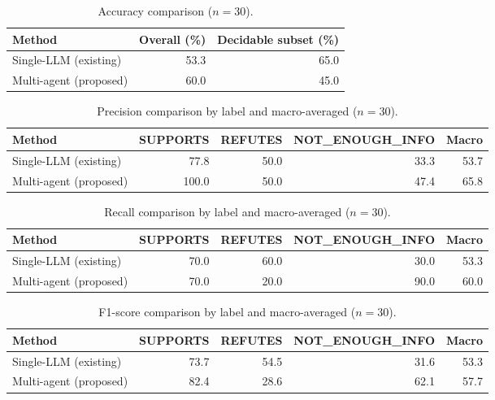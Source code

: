 
\begin{table}[H]
\centering
\caption{Accuracy comparison ($n = 30$).}
\label{tab:acc}
\small
\begin{tabular}{@{}lrr@{}}
\toprule
Method & Overall (\%) & Decidable subset (\%) \\
\midrule
Single-LLM (existing) & 53.3 & 65.0 \\
Multi-agent (proposed) & 60.0 & 45.0 \\
\bottomrule
\end{tabular}
\end{table}

\begin{table}[H]
\centering
\caption{Precision comparison by label and macro-averaged ($n = 30$).}
\label{tab:precision}
\small
\begin{tabular}{@{}lrrrr@{}}
\toprule
Method & SUPPORTS & REFUTES & NOT\_ENOUGH\_INFO & Macro \\
\midrule
Single-LLM (existing) & 77.8 & 50.0 & 33.3 & 53.7 \\
Multi-agent (proposed) & 100.0 & 50.0 & 47.4 & 65.8 \\
\bottomrule
\end{tabular}
\end{table}

\begin{table}[H]
\centering
\caption{Recall comparison by label and macro-averaged ($n = 30$).}
\label{tab:recall}
\small
\begin{tabular}{@{}lrrrr@{}}
\toprule
Method & SUPPORTS & REFUTES & NOT\_ENOUGH\_INFO & Macro \\
\midrule
Single-LLM (existing) & 70.0 & 60.0 & 30.0 & 53.3 \\
Multi-agent (proposed) & 70.0 & 20.0 & 90.0 & 60.0 \\
\bottomrule
\end{tabular}
\end{table}

\begin{table}[H]
\centering
\caption{F1-score comparison by label and macro-averaged ($n = 30$).}
\label{tab:f1}
\small
\begin{tabular}{@{}lrrrr@{}}
\toprule
Method & SUPPORTS & REFUTES & NOT\_ENOUGH\_INFO & Macro \\
\midrule
Single-LLM (existing) & 73.7 & 54.5 & 31.6 & 53.3 \\
Multi-agent (proposed) & 82.4 & 28.6 & 62.1 & 57.7 \\
\bottomrule
\end{tabular}
\end{table}

